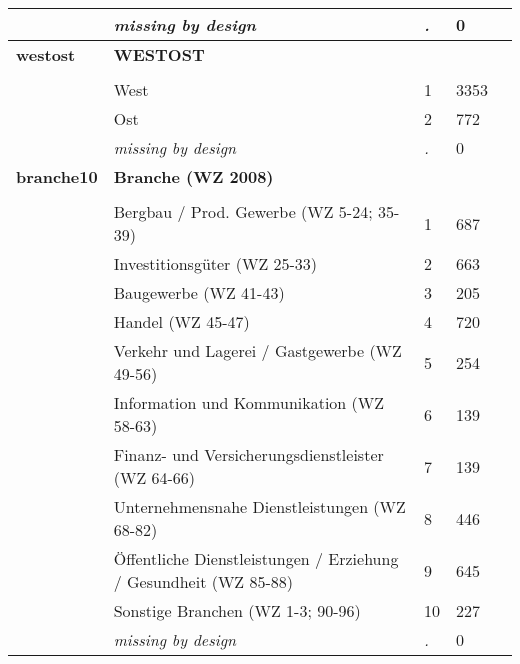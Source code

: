 \begin{longtable}{| L{2.65cm} | L{8cm} | C{1.5cm} | R{1.25cm} | C{2.25cm}  |}
   & \textit{missing by design} & \textit{.} & 0 &  \\ 
   \midrule
\textbf{westost}\label{var:westost} & \textbf{WESTOST} &  &  &  \\ 
   &  &  &  &  \\ 
   & West & 1 & 3353 &  \\ 
   & Ost & 2 & 772 &  \\ 
   & \textit{missing by design} & \textit{.} & 0 &  \\ 
   \midrule
\textbf{branche10}\label{var:branche10} & \textbf{Branche (WZ 2008)} &  &  &  \\ 
   &  &  &  &  \\ 
   & Bergbau / Prod. Gewerbe (WZ 5-24; 35-39) & 1 & 687 &  \\ 
   & Investitionsgüter (WZ 25-33) & 2 & 663 &  \\ 
   & Baugewerbe (WZ 41-43) & 3 & 205 &  \\ 
   & Handel (WZ 45-47) & 4 & 720 &  \\ 
   & Verkehr und Lagerei / Gastgewerbe (WZ 49-56) & 5 & 254 &  \\ 
   & Information und Kommunikation (WZ 58-63) & 6 & 139 &  \\ 
   & Finanz- und Versicherungsdienstleister (WZ 64-66) & 7 & 139 &  \\ 
   & Unternehmensnahe Dienstleistungen (WZ 68-82) & 8 & 446 &  \\ 
   & Öffentliche Dienstleistungen / Erziehung / Gesundheit (WZ 85-88) & 9 & 645 &  \\ 
   & Sonstige Branchen (WZ 1-3; 90-96) & 10 & 227 &  \\ 
   & \textit{missing by design} & \textit{.} & 0 &  \\ 
  
\end{longtable}
